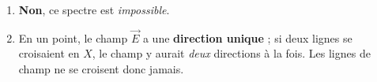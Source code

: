 \documentclass[11pt,a4paper]{article}
\newcommand{\vv}[1]{\vec{#1}}\newcommand{\ds}{\displaystyle}
\begin{document}
\begin{corrige}
\begin{enumerate}[label=\alph*)]
  \item \textbf{Non}, ce spectre est \emph{impossible}.
  \item En un point, le champ $\vv{E}$ a une \textbf{direction unique} ; si deux lignes se
        croisaient en $X$, le champ y aurait \emph{deux} directions à la fois. Les lignes de champ
        ne se croisent donc jamais.
\end{enumerate}
\end{corrige}
\end{document}
